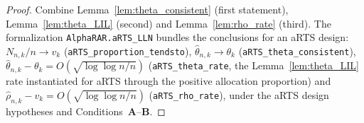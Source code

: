 \begin{proof}\leanok
{}
Combine Lemma~\ref{lem:theta_consistent} (first statement), Lemma~\ref{lem:theta_LIL}
(second) and Lemma~\ref{lem:rho_rate} (third). The formalization \texttt{AlphaRAR.aRTS\_LLN} bundles
the conclusions for an aRTS design: $N_{n,k}/n\to v_k$ (\texttt{aRTS\_proportion\_tendsto}),
$\hat\theta_{n,k}\to\theta_k$ (\texttt{aRTS\_theta\_consistent}),
$\hat\theta_{n,k}-\theta_k=O(\sqrt{\log\log n/n})$ (\texttt{aRTS\_theta\_rate}, the
Lemma~\ref{lem:theta_LIL} rate instantiated for aRTS through the positive allocation proportion)
and $\hat\rho_{n,k}-v_k=O(\sqrt{\log\log n/n})$ (\texttt{aRTS\_rho\_rate}), under the aRTS design
hypotheses and Conditions~\textbf{A}--\textbf{B}.
\end{proof}
